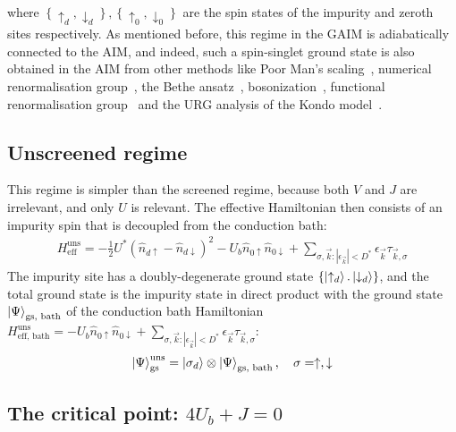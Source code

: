 \documentclass[reprint,superscriptaddress,floatfix]{revtex4-2}
\begin{document}
where \(\left\{\uparrow_d, \downarrow_d\right\}, \left\{\uparrow_0, \downarrow_0\right\}\) are the spin states of the impurity and zeroth sites respectively. As mentioned before, this regime in the GAIM is adiabatically connected to the AIM, and indeed, such a spin-singlet ground state is also obtained in the AIM from other methods like Poor Man's scaling~\cite{anderson1969exact,anderson1970}, numerical renormalisation group~\cite{wilson1975,hrk_wilson_1980}, the Bethe ansatz~\cite{andrei_1980,andreiKondoreview,Wiegmann_1981,tsvelickKondoreview}, bosonization~\cite{kotliar_1996,Duki_2011,borda_2008}, functional renormalisation group~\cite{streib_2013} and the URG analysis of the Kondo model~\cite{anirban_kondo}.

\subsection{Unscreened regime}

This regime is simpler than the screened regime, because both \(V\) and \(J\) are irrelevant, and only \(U\) is relevant. The effective Hamiltonian then consists of an impurity spin that is decoupled from the conduction bath:
\begin{equation}\begin{aligned}
	H_\text{eff}^\text{uns} = -\frac{1}{2}U^*\left(\hat n_{d \uparrow} - \hat n_{d \downarrow}\right)^2 - U_b \hat n_{0 \uparrow} \hat n_{0 \downarrow} + \sum_{\sigma,\vec k:|\epsilon_{\vec k}| < D^*} \epsilon_{\vec k} \tau_{\vec k,\sigma}
\end{aligned}\end{equation}
The impurity site has a doubly-degenerate ground state \(\left\{ \ket{\uparrow_d}.\ket{\downarrow_d}\right\}\), and the total ground state is the impurity state in direct product with the ground state \(\ket{\Psi}_\text{gs, bath}\) of the conduction bath Hamiltonian \(H_\text{eff, bath}^\text{uns} =  - U_b \hat n_{0 \uparrow} \hat n_{0 \downarrow} + \sum_{\sigma,\vec k:|\epsilon_{\vec k}| < D^*} \epsilon_{\vec k} \tau_{\vec k,\sigma}\):
\begin{equation}\begin{aligned}
	\ket{\Psi}_\text{gs}^\text{uns} = \ket{\sigma_d}\otimes\ket{\Psi}_\text{gs, bath}, ~ ~ ~ \sigma = \uparrow,\downarrow
\end{aligned}\end{equation}



\subsection{The critical point: \(4U_b + J = 0\)}
\end{document}

